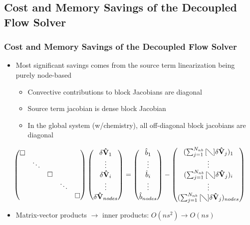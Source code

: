 \documentclass{beamer}
\begin{document}
\subsection{Cost and Memory Savings of the Decoupled Flow Solver}

\begin{frame}
  \frametitle{Cost and Memory Savings of the Decoupled Flow Solver}
\begin{itemize}
  \item Most significant savings comes from the source term linearization being purely node-based
    \begin{itemize}
      \item Convective contributions to block Jacobians are diagonal
      \item Source term jacobian is dense block Jacobian
      \item In the global system (w/chemistry), all off-diagonal block jacobians
        are diagonal
    \end{itemize}
  \end{itemize}
  \[
    \begin{pmatrix} 
      \Box & & & & \\ 
      & \ddots & & & \\ 
      & & \Box \\ 
      & & & \ddots & \\ 
      & & & & \Box
    \end{pmatrix} \begin{pmatrix} \delta \mathbf{\hat{V}}_1 \\ \vdots \\ \delta
      \mathbf{\hat{V}}_i \\ \vdots \\ \delta \mathbf{\hat{V}}_{nodes}
    \end{pmatrix} = \begin{pmatrix} \hat{b}_1 \\ \vdots \\ \hat{b}_i \\ \vdots \\
      \hat{b}_{nodes} \end{pmatrix} - \begin{pmatrix}
      (\sum_{j=1}^{N_{nb}}{[\diagdown] \delta\mathbf{\hat{V}}_{j}})_1 \\ \vdots \\
      (\sum_{j=1}^{N_{nb}}{[\diagdown] \delta\mathbf{\hat{V}}_{j}})_i \\ \vdots \\
      (\sum_{j=1}^{N_{nb}}{[\diagdown] \delta\mathbf{\hat{V}}_{j}})_{nodes}
    \end{pmatrix} 
  \]
  \begin{itemize}
    \item Matrix-vector products $\to$ inner products: $O(ns^2) \to O(ns)$
  \end{itemize}
\end{frame}
\end{document}
